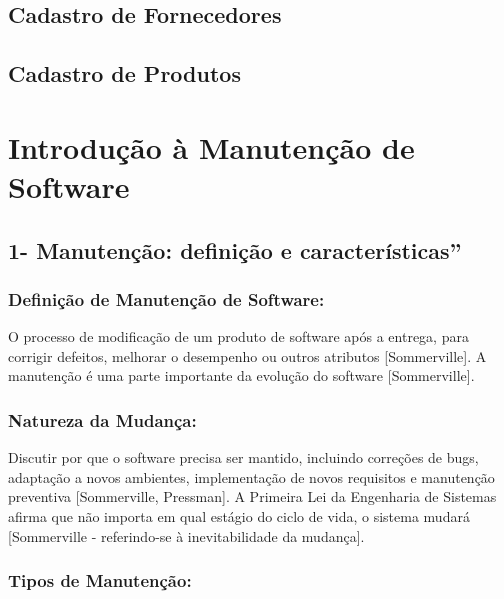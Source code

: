 \documentclass[
]{book}
\begin{document}
\section{Cadastro de Fornecedores}\label{cadastro-de-fornecedores}

\section{Cadastro de Produtos}\label{cadastro-de-produtos}

\chapter{Introdução à Manutenção de Software}\label{introduuxe7uxe3o-uxe0-manutenuxe7uxe3o-de-software}

\section{1- Manutenção: definição e características''}\label{manutenuxe7uxe3o-definiuxe7uxe3o-e-caracteruxedsticas}

\subsection{Definição de Manutenção de Software:}\label{definiuxe7uxe3o-de-manutenuxe7uxe3o-de-software}

O processo de modificação de um produto de software após a entrega, para corrigir defeitos, melhorar o desempenho ou outros atributos {[}Sommerville{]}. A manutenção é uma parte importante da evolução do software {[}Sommerville{]}.

\subsection{Natureza da Mudança:}\label{natureza-da-mudanuxe7a}

Discutir por que o software precisa ser mantido, incluindo correções de bugs, adaptação a novos ambientes, implementação de novos requisitos e manutenção preventiva {[}Sommerville, Pressman{]}. A Primeira Lei da Engenharia de Sistemas afirma que não importa em qual estágio do ciclo de vida, o sistema mudará {[}Sommerville - referindo-se à inevitabilidade da mudança{]}.

\subsection{Tipos de Manutenção:}\label{tipos-de-manutenuxe7uxe3o}
\end{document}
